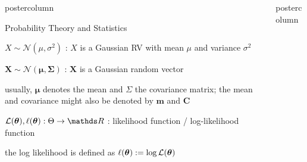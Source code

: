 \documentclass{beamer}
\newlength{\columnheight} %
\begin{document}
\begin{frame}[fragile]{}
\begin{columns}
\begin{column}{.31\textwidth}
\begin{beamercolorbox}[center]{postercolumn}
\begin{minipage}{.98\textwidth}
{\begin{myblock}{Probability Theory and Statistics}
						\begin{codebox}
							 $X \sim \mathcal{N}(\mu, \sigma^2)$ : $X$ is a Gaussian RV with mean $\mu$ and variance $\sigma^2$
						\end{codebox}
						\hspace*{1ex}
						\begin{codebox}
							 $\bm{X} \sim \mathcal{N}(\bm{\mu}, \bm{\Sigma})$ : $\bm{X}$ is a Gaussian random vector
						\end{codebox}
						\hspace*{1ex} usually, $\bm{\mu}$ denotes the mean and $\Sigma$ the covariance matrix; the mean and covariance might also be denoted by $\bm{m}$ and $\bm{C}$\\
						\begin{codebox}
							 $\mathcal{L}(\thetab), \ell(\thetab): \Theta \to \R$ : likelihood function / log-likelihood function
						\end{codebox}
						\hspace*{1ex} the log likelihood is defined as $\ell(\bm{\theta}) := \log \mathcal{L}(\bm{\theta})$		

					\end{myblock}					
					\vfill
					}
			\end{minipage}
		\end{beamercolorbox}
	\end{column}
	\begin{column}{.31\textwidth}
		\begin{beamercolorbox}[center]{postercolumn}
			\begin{minipage}{.98\textwidth}
				\parbox[t][\columnheight]{\textwidth}{
		
}
\end{minipage}
\end{beamercolorbox}
\end{column}
\end{columns}
\end{frame}
\end{document}

